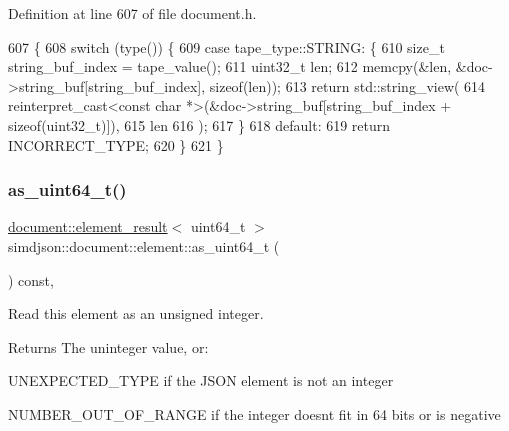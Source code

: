 Definition at line 607 of file document.\+h.


\begin{DoxyCode}
607                                                                                         \{
608   \textcolor{keywordflow}{switch} (type()) \{
609     \textcolor{keywordflow}{case} tape\_type::STRING: \{
610       \textcolor{keywordtype}{size\_t} string\_buf\_index = tape\_value();
611       uint32\_t len;
612       memcpy(&len, &doc->string\_buf[string\_buf\_index], \textcolor{keyword}{sizeof}(len));
613       \textcolor{keywordflow}{return} std::string\_view(
614         reinterpret\_cast<const char *>(&doc->string\_buf[string\_buf\_index + \textcolor{keyword}{sizeof}(uint32\_t)]),
615         len
616       );
617     \}
618     \textcolor{keywordflow}{default}:
619       \textcolor{keywordflow}{return} INCORRECT\_TYPE;
620   \}
621 \}
\end{DoxyCode}
\mbox{\label{classsimdjson_1_1document_1_1element_ab89d449ae4c78aced06643d7323cbdfb}} 
\subsubsection{\texorpdfstring{as\+\_\+uint64\+\_\+t()}{as\_uint64\_t()}}
{\footnotesize\ttfamily \hyperlink{classsimdjson_1_1document_1_1element__result}{document\+::element\+\_\+result}$<$ uint64\+\_\+t $>$ simdjson\+::document\+::element\+::as\+\_\+uint64\+\_\+t (\begin{DoxyParamCaption}{ }\end{DoxyParamCaption}) const\hspace{0.3cm}{\ttfamily [inline]}, {\ttfamily [noexcept]}}



Read this element as an unsigned integer. 

\begin{DoxyReturn}{Returns}
The uninteger value, or\+:
\begin{DoxyItemize}
\item U\+N\+E\+X\+P\+E\+C\+T\+E\+D\+\_\+\+T\+Y\+PE if the J\+S\+ON element is not an integer
\item N\+U\+M\+B\+E\+R\+\_\+\+O\+U\+T\+\_\+\+O\+F\+\_\+\+R\+A\+N\+GE if the integer doesn\textquotesingle{}t fit in 64 bits or is negative 
\end{DoxyItemize}
\end{DoxyReturn}


